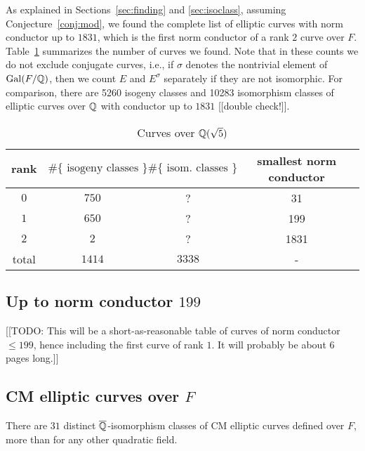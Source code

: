 \documentclass{amsart}
\begin{document}
As explained in Sections~\ref{sec:finding} and \ref{sec:isoclass},
assuming Conjecture~\ref{conj:mod}, we found the complete list of
elliptic curves with norm conductor up to $1831$, which is the first
norm conductor of a rank $2$ curve over $F$.  Table~\ref{table:counts}
summarizes the number of curves we found.  Note that in these counts
we do not exclude conjugate curves, i.e., if $\sigma$ denotes the
nontrivial element of $\operatorname{Gal}(F/\mathbb{Q})$, then we count $E$ and $E^{\sigma}$
separately if they are not isomorphic.  For comparison, 
there are 5260 isogeny classes and 10283 isomorphism classes
of elliptic curves over $\mathbb{Q}$ with conductor up to $1831$ [[double check!]].
\begin{center}
\begin{table}[h]
\caption{Curves over $\mathbb{Q}(\sqrt{5})$\label{table:counts}}
\begin{tabular}{|c|c|c|c|}\hline
rank & $\#\{\text{ isogeny classes }\}$ &  $\#\{\text{ isom. classes }\}$ & smallest norm conductor\\\hline
 $0$ & $750$ & ? & 31\\\hline
 $1$ & $650$ & ? & 199\\\hline
 $2$ & $2$ & ?  & 1831\\\hline
total & $1414$ & $3338$ & - \\\hline
\end{tabular}
\end{table}
\end{center}

\subsection{Up to norm conductor  $199$}\label{sec:to199}

[[TODO: This will be a short-as-reasonable table of curves of norm
conductor $\leq 199$, hence including the first curve of rank $1$.  It
will probably be about 6 pages long.]]

\subsection{CM elliptic curves over $F$}\label{sec:cm}

There are $31$ distinct $\overline{\mathbb{Q}}$-isomorphism classes of CM elliptic
curves defined over $F$, more than for any other
quadratic field.
\end{document}
